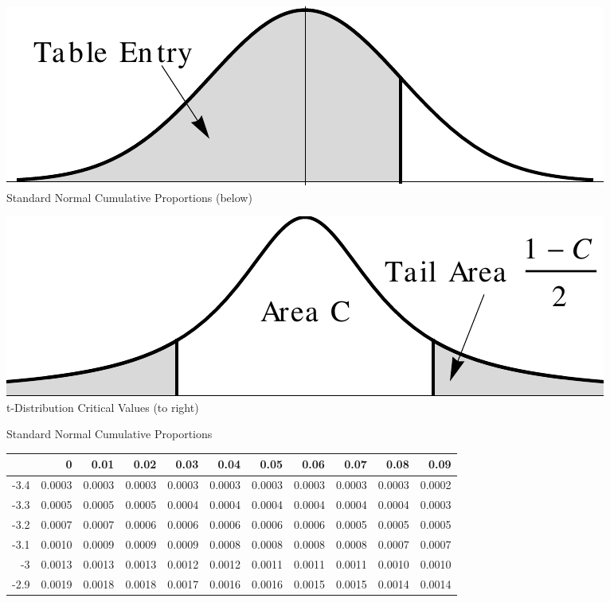 \begin{center}
\begin{minipage}{5in}
\begin{flushright}
\begin{minipage}{2.25in}
\includegraphics[width=.75\textwidth]{Normal-Curve.pdf} \\
\sffamily
{} Standard Normal Cumulative Proportions (below)
\end{minipage}%
\begin{minipage}{2.25in} 
\includegraphics[width=.75\textwidth]{t-Curve.pdf}\\
\sffamily{}t-Distribution Critical Values (to right)
\end{minipage}
\end{flushright}
\begin{center}
Standard Normal Cumulative Proportions
\sffamily
{}
\renewcommand{\arraystretch}{1.1}
\begin{tabular}{|r|rrrrrrrrrr|}
\hline		&	0	&	0.01	&	0.02	&	0.03	&	0.04	&	0.05	&	0.06	&	0.07	&	0.08	&	0.09	\\ \hline
	-3.4	&	0.0003	&	0.0003	&	0.0003	&	0.0003	&	0.0003	&	0.0003	&	0.0003	&	0.0003	&	0.0003	&	0.0002	\\
	-3.3	&	0.0005	&	0.0005	&	0.0005	&	0.0004	&	0.0004	&	0.0004	&	0.0004	&	0.0004	&	0.0004	&	0.0003	\\
	-3.2	&	0.0007	&	0.0007	&	0.0006	&	0.0006	&	0.0006	&	0.0006	&	0.0006	&	0.0005	&	0.0005	&	0.0005	\\
	-3.1	&	0.0010	&	0.0009	&	0.0009	&	0.0009	&	0.0008	&	0.0008	&	0.0008	&	0.0008	&	0.0007	&	0.0007	\\
	-3	&	0.0013	&	0.0013	&	0.0013	&	0.0012	&	0.0012	&	0.0011	&	0.0011	&	0.0011	&	0.0010	&	0.0010	\\
\cellcolor{lightgray}	-2.9	&\cellcolor{lightgray}	0.0019	&\cellcolor{lightgray}	0.0018	&\cellcolor{lightgray}	0.0018	&\cellcolor{lightgray}	0.0017	&\cellcolor{lightgray}	0.0016	&\cellcolor{lightgray}	0.0016	&\cellcolor{lightgray}	0.0015	&\cellcolor{lightgray}	0.0015	&\cellcolor{lightgray}	0.0014	&\cellcolor{lightgray}	0.0014	\\

\end{tabular}
\end{center}
\end{minipage}
\end{center}
